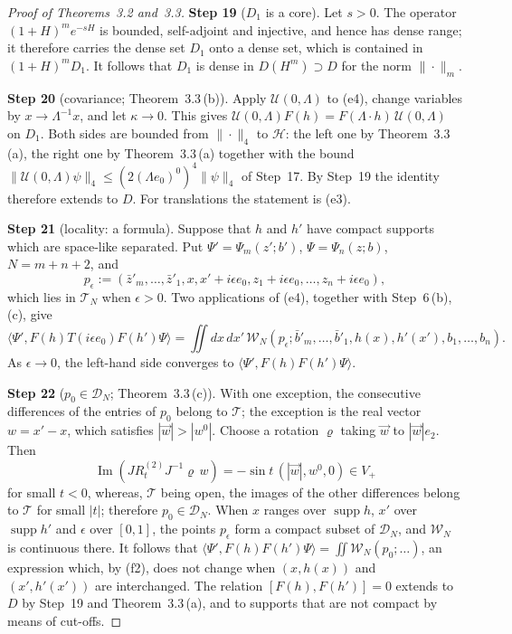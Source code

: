 \documentclass[11pt,letterpaper,reqno]{amsart}
\theoremstyle{definition}
\begin{document}
\begin{proof}[Proof of Theorems~3.2 and~3.3]
\textbf{Step 19} ($D_1$ is a core).
Let $s>0$.
The operator $(1+H)^me^{-sH}$ is bounded, self-adjoint and injective, and hence has dense range; it therefore carries the dense set $D_1$ onto a dense set, which is contained in $(1+H)^mD_1$.
It follows that $D_1$ is dense in $D(H^m)\supset D$ for the norm $\|\cdot\|_m$.

\textbf{Step 20} (covariance; Theorem~3.3\,(b)).
Apply $\mathcal U(0,\Lambda)$ to (e4), change variables by $x\to\Lambda^{-1}x$, and let $\kappa\to0$.
This gives $\mathcal U(0,\allowbreak \Lambda)F(h)=\allowbreak F(\Lambda\cdot h)\,\allowbreak \mathcal U(0,\allowbreak \Lambda)$ on $D_1$.
Both sides are bounded from $\|\cdot\|_4$ to $\mathcal H$: the left one by Theorem~3.3\,(a), the right one by Theorem~3.3\,(a) together with the bound $\|\mathcal U(0,\Lambda)\psi\|_4\le(2(\Lambda e_0)^0)^4\|\psi\|_4$ of Step~17.
By Step~19 the identity therefore extends to $D$.
For translations the statement is (e3).

\textbf{Step 21} (locality: a formula).
Suppose that $h$ and $h'$ have compact supports which are space-like separated.
Put $\Psi'=\Psi_m(z';b')$, $\Psi=\Psi_n(z;b)$, $N=m+n+2$, and
\begin{equation*}
p_\epsilon:=(\bar z'_m,\dots,\bar z'_1,x,x'+i\epsilon e_0,z_1+i\epsilon e_0,\dots,z_n+i\epsilon e_0),
\end{equation*}
which lies in $\mathcal T_N$ when $\epsilon>0$.
Two applications of (e4), together with Step~6\,(b), (c), give
\begin{equation*}
\langle\Psi',F(h)T(i\epsilon e_0)F(h')\Psi\rangle=\iint dx\,dx'\,\mathcal W_N(p_\epsilon;\bar b'_m,\dots,\bar b'_1,h(x),h'(x'),b_1,\dots,b_n).
\end{equation*}
As $\epsilon\to0$, the left-hand side converges to $\langle\Psi',F(h)F(h')\Psi\rangle$.

\textbf{Step 22} ($p_0\in\mathcal D_N$; Theorem~3.3\,(c)).
With one exception, the consecutive differences of the entries of $p_0$ belong to $\mathcal T$; the exception is the real vector $w=x'-x$, which satisfies $|\vec w|>|w^0|$.
Choose a rotation $\varrho$ taking $\vec w$ to $|\vec w|e_2$.
Then
\begin{equation*}
\operatorname{Im}(JR^{(2)}_tJ^{-1}\varrho\,w)=-\sin t\,(|\vec w|,w^0,0)\in V_+
\end{equation*}
for small $t<0$, whereas, $\mathcal T$ being open, the images of the other differences belong to $\mathcal T$ for small $|t|$; therefore $p_0\in\mathcal D_N$.
When $x$ ranges over $\operatorname{supp}h$, $x'$ over $\operatorname{supp}h'$ and $\epsilon$ over $[0,1]$, the points $p_\epsilon$ form a compact subset of $\mathcal D_N$, and $\mathcal W_N$ is continuous there.
It follows that $\langle\Psi',F(h)F(h')\Psi\rangle=\iint\mathcal W_N(p_0;\dots)$, an expression which, by (f2), does not change when $(x,h(x))$ and $(x',h'(x'))$ are interchanged.
The relation $[F(h),F(h')]=0$ extends to $D$ by Step~19 and Theorem~3.3\,(a), and to supports that are not compact by means of cut-offs.


\end{proof}
\end{document}
